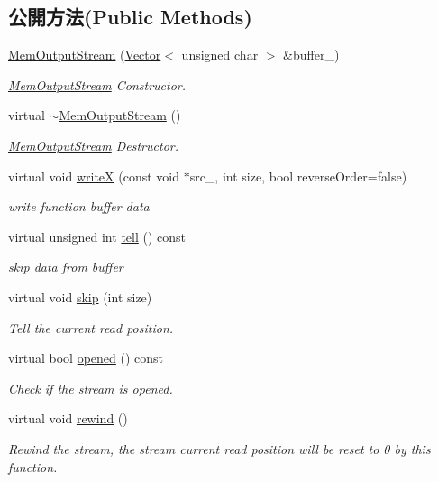 \subsection*{公開方法(Public Methods)}
\begin{DoxyCompactItemize}
\item 
\hyperlink{class_i_dream_sky_1_1_mem_output_stream_a47f9054625e2ffa1b939a5d0c2b7e5f6}{Mem\+Output\+Stream} (\hyperlink{class_i_dream_sky_1_1_vector}{Vector}$<$ unsigned char $>$ \&buffer\+\_\+)
\begin{DoxyCompactList}\small\item\em \hyperlink{class_i_dream_sky_1_1_mem_output_stream}{Mem\+Output\+Stream} Constructor. \end{DoxyCompactList}\item 
virtual \hyperlink{class_i_dream_sky_1_1_mem_output_stream_ad7b29041f995fce6fddd84c88064b7c1}{$\sim$\+Mem\+Output\+Stream} ()
\begin{DoxyCompactList}\small\item\em \hyperlink{class_i_dream_sky_1_1_mem_output_stream}{Mem\+Output\+Stream} Destructor. \end{DoxyCompactList}\item 
virtual void \hyperlink{class_i_dream_sky_1_1_mem_output_stream_ad55c8d9ab626c7813d4e462058f373e4}{writeX} (const void $\ast$src\+\_\+, int size, bool reverse\+Order=false)
\begin{DoxyCompactList}\small\item\em write function buffer data \end{DoxyCompactList}\item 
virtual unsigned int \hyperlink{class_i_dream_sky_1_1_mem_output_stream_a23b7bf69ae892e46af025620d7c66220}{tell} () const 
\begin{DoxyCompactList}\small\item\em skip data from buffer \end{DoxyCompactList}\item 
virtual void \hyperlink{class_i_dream_sky_1_1_mem_output_stream_a4c9a681b50dc976a0750705319659553}{skip} (int size)
\begin{DoxyCompactList}\small\item\em Tell the current read position. \end{DoxyCompactList}\item 
virtual bool \hyperlink{class_i_dream_sky_1_1_mem_output_stream_aebe23ef0fd8c8b99352fb301e4596573}{opened} () const 
\begin{DoxyCompactList}\small\item\em Check if the stream is opened. \end{DoxyCompactList}\item 
virtual void \hyperlink{class_i_dream_sky_1_1_mem_output_stream_af786069f281ed927c62ca433579b8051}{rewind} ()
\begin{DoxyCompactList}\small\item\em Rewind the stream, the stream current read position will be reset to 0 by this function. \end{DoxyCompactList}\end{DoxyCompactItemize}
